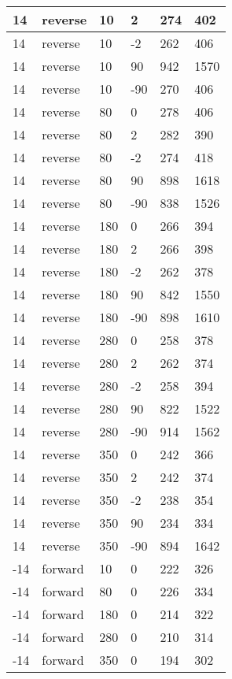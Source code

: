 \begin{table}
\begin{center}
\begin{tabular}{|l|l|l|l|l|l|}
			\hline
			14 & reverse & 10 & 2 & 274 & 402 \\
			\hline
			14 & reverse & 10 & -2 & 262 & 406 \\
			\hline
			14 & reverse & 10 & 90 & 942 & 1570 \\
			\hline
			14 & reverse & 10 & -90 & 270 & 406 \\
			\hline
			14 & reverse & 80 & 0 & 278 & 406 \\
			\hline
			14 & reverse & 80 & 2 & 282 & 390 \\
			\hline
			14 & reverse & 80 & -2 & 274 & 418 \\
			\hline
			14 & reverse & 80 & 90 & 898 & 1618 \\
			\hline
			14 & reverse & 80 & -90 & 838 & 1526 \\
			\hline
			14 & reverse & 180 & 0 & 266 & 394 \\
			\hline
			14 & reverse & 180 & 2 & 266 & 398 \\
			\hline
			14 & reverse & 180 & -2 & 262 & 378 \\
			\hline
			14 & reverse & 180 & 90 & 842 & 1550 \\
			\hline
			14 & reverse & 180 & -90 & 898 & 1610 \\
			\hline
			14 & reverse & 280 & 0 & 258 & 378 \\
			\hline
			14 & reverse & 280 & 2 & 262 & 374 \\
			\hline
			14 & reverse & 280 & -2 & 258 & 394 \\
			\hline
			14 & reverse & 280 & 90 & 822 & 1522 \\
			\hline
			14 & reverse & 280 & -90 & 914 & 1562 \\
			\hline
			14 & reverse & 350 & 0 & 242 & 366 \\
			\hline
			14 & reverse & 350 & 2 & 242 & 374 \\
			\hline
			14 & reverse & 350 & -2 & 238 & 354 \\
			\hline
			14 & reverse & 350 & 90 & 234 & 334 \\
			\hline
			14 & reverse & 350 & -90 & 894 & 1642 \\
			\hline
			-14 & forward & 10 & 0 & 222 & 326 \\
			\hline
			-14 & forward & 80 & 0 & 226 & 334 \\
			\hline
			-14 & forward & 180 & 0 & 214 & 322 \\
			\hline
			-14 & forward & 280 & 0 & 210 & 314 \\
			\hline
			-14 & forward & 350 & 0 & 194 & 302 \\

\end{tabular}
\end{center}
\end{table}
